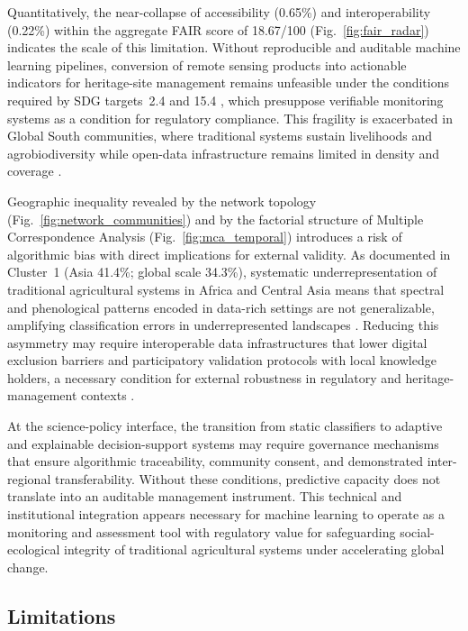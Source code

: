\documentclass[lineno,pdflatex,sn-apa]{sn-jnl}
\begin{document}
Quantitatively, the near-collapse of accessibility (0.65\%) and interoperability (0.22\%) within the aggregate FAIR score of 18.67/100 (Fig.~\ref{fig:fair_radar}) indicates the scale of this limitation. Without reproducible and auditable machine learning pipelines, conversion of remote sensing products into actionable indicators for heritage-site management remains unfeasible under the conditions required by SDG targets~2.4 and 15.4 \citep{UN2015,Mottet2020TAPE}, which presuppose verifiable monitoring systems as a condition for regulatory compliance. This fragility is exacerbated in Global South communities, where traditional systems sustain livelihoods and agrobiodiversity while open-data infrastructure remains limited in density and coverage \citep{Kshetri2014DigitalDivide}.

Geographic inequality revealed by the network topology (Fig.~\ref{fig:network_communities}) and by the factorial structure of Multiple Correspondence Analysis (Fig.~\ref{fig:mca_temporal}) introduces a risk of algorithmic bias with direct implications for external validity. As documented in Cluster~1 (Asia 41.4\%; global scale 34.3\%), systematic underrepresentation of traditional agricultural systems in Africa and Central Asia means that spectral and phenological patterns encoded in data-rich settings are not generalizable, amplifying classification errors in underrepresented landscapes \citep{Santos2007Epistemologies,Tuia2021}. Reducing this asymmetry may require interoperable data infrastructures that lower digital exclusion barriers \citep{Kshetri2014DigitalDivide} and participatory validation protocols with local knowledge holders, a necessary condition for external robustness in regulatory and heritage-management contexts \citep{Berkes2003,Altieri2004}.

At the science-policy interface, the transition from static classifiers to adaptive and explainable decision-support systems may require governance mechanisms that ensure algorithmic traceability, community consent, and demonstrated inter-regional transferability. Without these conditions, predictive capacity does not translate into an auditable management instrument. This technical and institutional integration appears necessary for machine learning to operate as a monitoring and assessment tool with regulatory value for safeguarding social-ecological integrity of traditional agricultural systems under accelerating global change.

\subsection{Limitations}
\end{document}
